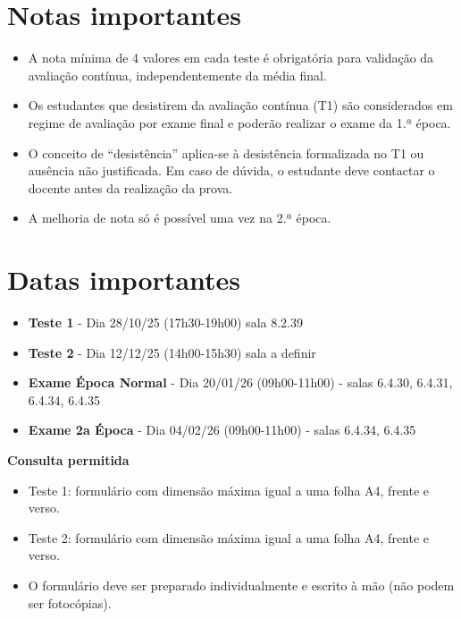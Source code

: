 \documentclass[
]{book}
\providecommand{\tightlist}{%
  \setlength{\itemsep}{0pt}\setlength{\parskip}{0pt}}
\begin{document}
\section{Notas importantes}\label{notas-importantes}

\begin{itemize}
\tightlist
\item
  A nota mínima de 4 valores em cada teste é obrigatória para validação da avaliação contínua, independentemente da média final.
\item
  Os estudantes que desistirem da avaliação contínua (T1) são considerados em regime de avaliação por exame final e poderão realizar o exame da 1.ª época.
\item
  O conceito de ``desistência'' aplica-se à desistência formalizada no T1 ou ausência não justificada. Em caso de dúvida, o estudante deve contactar o docente antes da realização da prova.
\item
  A melhoria de nota só é possível uma vez na 2.ª época.
\end{itemize}

\section{Datas importantes}\label{datas-importantes}

\begin{itemize}
\tightlist
\item
  \textbf{Teste 1} - Dia 28/10/25 (17h30-19h00) sala 8.2.39
\item
  \textbf{Teste 2} - Dia 12/12/25 (14h00-15h30) sala a definir
\item
  \textbf{Exame Época Normal} - Dia 20/01/26 (09h00-11h00) - salas 6.4.30, 6.4.31, 6.4.34, 6.4.35
\item
  \textbf{Exame 2a Época} - Dia 04/02/26 (09h00-11h00) - salas 6.4.34, 6.4.35
\end{itemize}

\textbf{Consulta permitida}

\begin{itemize}
\item
  Teste 1: formulário com dimensão máxima igual a uma folha A4, frente
  e verso.
\item
  Teste 2: formulário com dimensão máxima igual a uma folha A4, frente
  e verso.
\item
  O formulário deve ser preparado individualmente e escrito à mão (não
  podem ser fotocópias).
\end{itemize}
\end{document}
